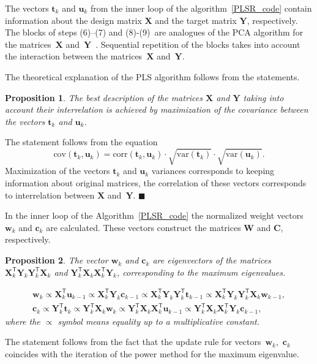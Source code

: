 \documentclass[12pt,twoside]{article}
\newtheorem{proposition}{Proposition}
\theoremstyle{definition}
\newcommand{\bw}{\mathbf{w}}
\newcommand{\bY}{\mathbf{Y}}
\newcommand{\bX}{\mathbf{X}}
\newcommand{\bu}{\mathbf{u}}
\newcommand{\bt}{\mathbf{t}}
\newcommand{\bc}{\mathbf{c}}
\newcommand{\bC}{\mathbf{C}}
\newcommand{\bW}{\mathbf{W}}
\newcommand{\T}{\mathsf{T}}
\begin{document}
The vectors $\bt_k$ and $\bu_k$ from the inner loop of the algorithm~\ref{PLSR_code} contain information about the design matrix $\bX$ and the target matrix $\bY$, respectively. 
The blocks of steps (6)--(7) and (8)-(9)~are analogues of the PCA algorithm for the matrices~$\bX$ and~$\bY$~\cite{geladi1986partial}. 
Sequential repetition of the blocks takes into account the interaction between the matrices~$\bX$ and~$\bY$.

The theoretical explanation of the PLS algorithm follows from the statements.
\begin{proposition}
	The best description of the matrices $\bX$ and $\bY$ taking into account their interrelation is achieved by maximization of the covariance between the vectors $\bt_k$ and $\bu_k$.
\end{proposition}
The statement follows from the equation
\begin{equation*}
\text{cov} (\bt_k, \bu_k) = \text{corr} (\bt_k, \bu_k) \cdot \sqrt{\text{var}(\bt_k)} \cdot \sqrt{\text{var}(\bu_k)}.
\end{equation*}
Maximization of the vectors $\bt_k$ and $\bu_k$ variances corresponds to keeping information about original matrices, the correlation of these vectors corresponds to interrelation between $\bX$ and~$\bY$. $\blacksquare$

In the inner loop of the Algorithm~\ref{PLSR_code} the normalized weight vectors $\bw_k$ and $\bc_k$ are calculated. 
These vectors construct the matrices $\bW$ and $\bC$, respectively.

\begin{proposition}
	The vector $\bw_k$ and $\bc_k$ are eigenvectors of the matrices $\bX_k^{\T} \bY_k \bY_k^{\T} \bX_k$ and $\bY_k^{\T} \bX_k \bX_k^{\T} \bY_k$, corresponding to the maximum eigenvalues.
	
	\begin{align*}
	\bw_k \varpropto \bX_k^{\T} \bu_{k-1} \varpropto \bX_k^{\T} \bY_k \bc_{k-1} \varpropto \bX_k^{\T} \bY_k \bY_k^{\T} \bt_{k-1} \varpropto \bX_k^{\T} \bY_k \bY_k^{\T} \bX_k \bw_{k-1}, \\
	\bc_k \varpropto \bY_k^{\T} \bt_k \varpropto \bY_k^{\T} \bX_k \bw_k \varpropto \bY_k^{\T} \bX_k \bX_k^{\T} \bu_{k-1} \varpropto \bY_k^{\T} \bX_k \bX_k^{\T} \bY_k \bc_{k-1},
	\end{align*}
	where the $\varpropto$ symbol means equality up to a multiplicative constant.
	\label{st:eig}
\end{proposition}

The statement follows from the fact that the update rule for vectors~$\bw_k$,~$\bc_k$ coincides with the iteration of the power method for the maximum eigenvalue.
\end{document}
